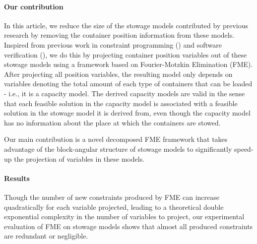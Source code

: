 \paragraph{Our contribution}
In this article, we reduce the size of the stowage models contributed by previous research by removing the container position information from these models. Inspired from previous work in constraint programming (\cite{lassez90}) and software verification (\cite{benoy05}), we do this by projecting container position variables out of these stowage models using a framework based on Fourier-Motzkin Elimination (FME). 
%
After projecting all position variables, the resulting model only depends on variables denoting the total amount of each type of containers that can be loaded - i.e., it is a capacity model. 
%
The derived capacity models are valid in the sense that each feasible solution in the capacity model is associated with a feasible solution in the stowage model it is derived from, even though the capacity model has no information about the place at which the containers are stowed. 

Our main contribution is a novel decomposed FME framework that takes advantage of the block-angular structure of stowage models to significantly speed-up the projection of variables in these models. 


\paragraph{Results}
%
Though the number of new constraints produced by FME can increase quadratically for each variable projected, leading to a theoretical double exponential complexity in the number of variables to project, %
our experimental evaluation of FME on stowage models shows that almost all produced constraints are redundant {or negligible}.

